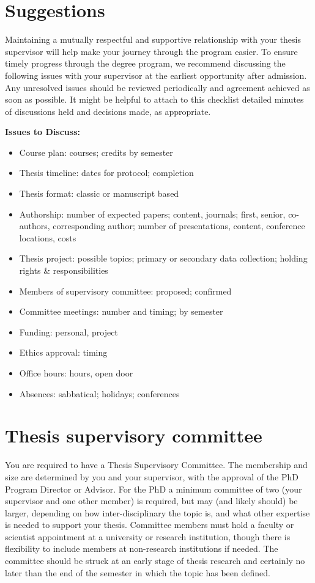 \documentclass[
  openany]{book}
\providecommand{\tightlist}{%
  \setlength{\itemsep}{0pt}\setlength{\parskip}{0pt}}
\begin{document}
\hypertarget{suggestions}{%
\section{Suggestions}\label{suggestions}}

Maintaining a mutually respectful and supportive relationship with your thesis supervisor will help make your journey through the program easier. To ensure timely progress through the degree program, we recommend discussing the following issues with your supervisor at the earliest opportunity after admission. Any unresolved issues should be reviewed periodically and agreement achieved as soon as possible. It might be helpful to attach to this checklist detailed minutes of discussions held and decisions made, as appropriate.

\textbf{Issues to Discuss:}

\begin{itemize}
\tightlist
\item
  Course plan: courses; credits by semester
\item
  Thesis timeline: dates for protocol; completion
\item
  Thesis format: classic or manuscript based
\item
  Authorship: number of expected papers; content, journals; first, senior, co-authors, corresponding author; number of presentations, content, conference locations, costs
\item
  Thesis project: possible topics; primary or secondary data collection; holding rights \& responsibilities
\item
  Members of supervisory committee: proposed; confirmed
\item
  Committee meetings: number and timing; by semester
\item
  Funding: personal, project
\item
  Ethics approval: timing
\item
  Office hours: hours, open door
\item
  Absences: sabbatical; holidays; conferences
\end{itemize}

\hypertarget{thesis-supervisory-committee}{%
\section{Thesis supervisory committee}\label{thesis-supervisory-committee}}

You are required to have a Thesis Supervisory Committee. The membership and size are determined by you and your supervisor, with the approval of the PhD Program Director or Advisor. For the PhD a minimum committee of two (your supervisor and one other member) is required, but may (and likely should) be larger, depending on how inter-disciplinary the topic is, and what other expertise is needed to support your thesis. Committee members must hold a faculty or scientist appointment at a university or research institution, though there is flexibility to include members at non-research institutions if needed. The committee should be struck at an early stage of thesis research and certainly no later than the end of the semester in which the topic has been defined.
\end{document}
